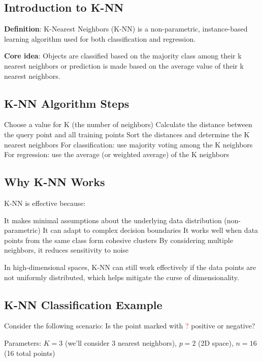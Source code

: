 \subsection{Introduction to K-NN}

\textbf{Definition}: K-Nearest Neighbors (K-NN) is a non-parametric, instance-based learning algorithm used for both classification and regression.

\textbf{Core idea}: Objects are classified based on the majority class among their k nearest neighbors or prediction is made based on the average value of their k nearest neighbors.

\subsection{K-NN Algorithm Steps}
\begin{outline}[enumerate]
    \1 Choose a value for K (the number of neighbors)
    \1 Calculate the distance between the query point and all training points
    \1 Sort the distances and determine the K nearest neighbors
    \1 For classification: use majority voting among the K neighbors
    \1 For regression: use the average (or weighted average) of the K neighbors
\end{outline}

\subsection{Why K-NN Works}
K-NN is effective because:
\begin{outline}
    \1 It makes minimal assumptions about the underlying data distribution (non-parametric)
    \1 It can adapt to complex decision boundaries
    \1 It works well when data points from the same class form cohesive clusters
    \1 By considering multiple neighbors, it reduces sensitivity to noise
\end{outline}

In high-dimensional spaces, K-NN can still work effectively if the data points are not uniformly distributed, which helps mitigate the curse of dimensionality.

\subsection{K-NN Classification Example}
Consider the following scenario: Is the point marked with \textcolor{red}{?} positive or negative?

Parameters: $K = 3$ (we'll consider 3 nearest neighbors), $p = 2$ (2D space), $n = 16$ (16 total points)

